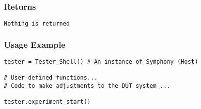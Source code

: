 \subsubsection{Returns}
\begin{lstlisting}[mathescape=true, keywordstyle=\color{black}]
Nothing is returned
\end{lstlisting}


\subsubsection{Usage Example}
\begin{lstlisting}
tester = Tester_Shell() # An instance of Symphony (Host)

# User-defined functions...
# Code to make adjustments to the DUT system ... 

tester.experiment_start()

\end{lstlisting}

